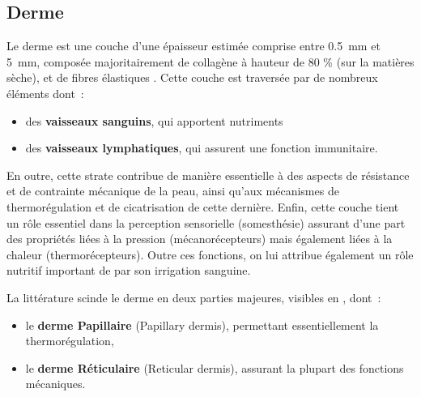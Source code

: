 \subsection{Derme}
Le derme est une couche d’une épaisseur estimée comprise entre \SI{0,5}{\milli\metre} et \SI{5}{\milli\metre}, composée majoritairement de collagène à hauteur de 80 \% (sur la matières sèche), et de fibres élastiques \cite{McGrath2010}. Cette couche est traversée par de nombreux éléments dont~: 

\begin{itemize}
    \item des \textbf{vaisseaux sanguins}, qui apportent nutriments
    \item des \textbf{vaisseaux lymphatiques}, qui assurent une fonction immunitaire.
\end{itemize}\par

En outre, cette strate contribue de manière essentielle à des aspects de résistance et de contrainte mécanique de la peau, ainsi qu’aux mécanismes de thermorégulation et de cicatrisation de cette dernière. Enfin, cette couche tient un rôle essentiel dans la perception sensorielle (somesthésie) assurant d’une part des propriétés liées à la pression (mécanorécepteurs) mais également liées à la chaleur (thermorécepteurs). Outre ces fonctions, on lui attribue également un rôle nutritif important de par son irrigation sanguine.\par

La littérature scinde le derme en deux parties majeures, visibles en , dont~:
\begin{itemize}
    \item le \textbf{derme Papillaire} (Papillary dermis), permettant essentiellement la thermorégulation,
    \item le \textbf{derme Réticulaire} (Reticular dermis), assurant la plupart des fonctions mécaniques.
\end{itemize}\par

